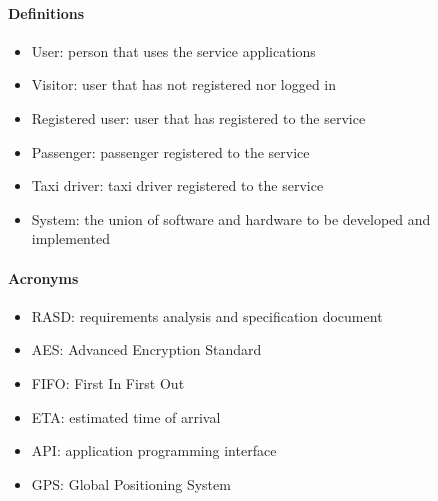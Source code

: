 \paragraph{Definitions}
\begin{itemize}
	\item User: person that uses the service applications
	\item Visitor: user that has not registered nor logged in
	\item Registered user: user that has registered to the service
	\item Passenger: passenger registered to the service
	\item Taxi driver: taxi driver registered to the service
	\item System: the union of software and hardware to be developed and implemented
\end{itemize}
\paragraph{Acronyms}
\begin{itemize}
	\item RASD: requirements analysis and specification document
	\item AES: Advanced Encryption Standard
	\item FIFO: First In First Out
	\item ETA: estimated time of arrival
	\item API: application programming interface
	\item GPS: Global Positioning System
\end{itemize}